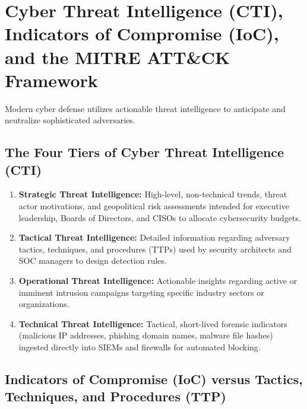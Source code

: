 \newpage
\section{Cyber Threat Intelligence (CTI), Indicators of Compromise (IoC), and the MITRE ATT\&CK Framework}

Modern cyber defense utilizes actionable threat intelligence to anticipate and neutralize sophisticated adversaries.

\subsection{The Four Tiers of Cyber Threat Intelligence (CTI)}

\begin{enumerate}
\item \textbf{Strategic Threat Intelligence:} High-level, non-technical trends, threat actor motivations, and geopolitical risk assessments intended for executive leadership, Boards of Directors, and CISOs to allocate cybersecurity budgets.
\item \textbf{Tactical Threat Intelligence:} Detailed information regarding adversary tactics, techniques, and procedures (TTPs) used by security architects and SOC managers to design detection rules.
\item \textbf{Operational Threat Intelligence:} Actionable insights regarding active or imminent intrusion campaigns targeting specific industry sectors or organizations.
\item \textbf{Technical Threat Intelligence:} Tactical, short-lived forensic indicators (malicious IP addresses, phishing domain names, malware file hashes) ingested directly into SIEMs and firewalls for automated blocking.
\end{enumerate}

\subsection{Indicators of Compromise (IoC) versus Tactics, Techniques, and Procedures (TTP)}

